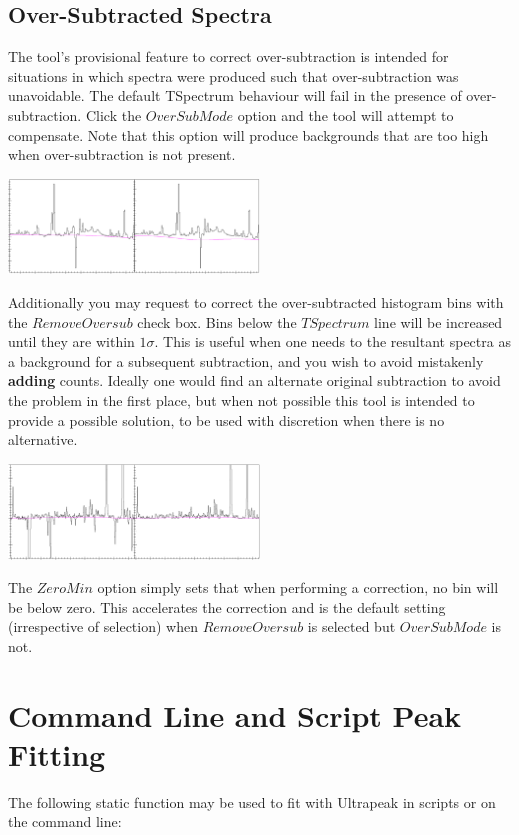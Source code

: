 \documentclass[a4paper,10pt]{article}
\begin{document}
\subsection{Over-Subtracted Spectra}
The tool's provisional feature to correct over-subtraction is intended for situations in which spectra were produced such that over-subtraction was unavoidable. The default TSpectrum behaviour will fail in the presence of over-subtraction. Click the $OverSubMode$ option and the tool will attempt to compensate. Note that this option will produce backgrounds that are too high when over-subtraction is not present.
\begin{center}
\includegraphics[width=0.5\textwidth]{TSpectrum2.png}
\end{center}
Additionally you may request to correct the over-subtracted histogram bins with the $Remove Oversub$ check box. Bins below the $TSpectrum$ line will be increased until they are within $1\sigma$. This is useful when one needs to the resultant spectra as a background for a subsequent subtraction, and you wish to avoid mistakenly \textbf{adding} counts. Ideally one would find an alternate original subtraction to avoid the problem in the first place, but when not possible this tool is intended to provide a possible solution, to be used with discretion when there is no alternative.
\begin{center}
\includegraphics[width=0.5\textwidth]{TSpectrum3.png}
\end{center}
The $ZeroMin$ option simply sets that when performing a correction, no bin will be below zero. This accelerates the correction and is the default setting (irrespective of selection) when $Remove Oversub$ is selected but $OverSubMode$ is not.


\section{Command Line and Script Peak Fitting}
The following static function may be used to fit with Ultrapeak in scripts or on the command line:
\end{document}
